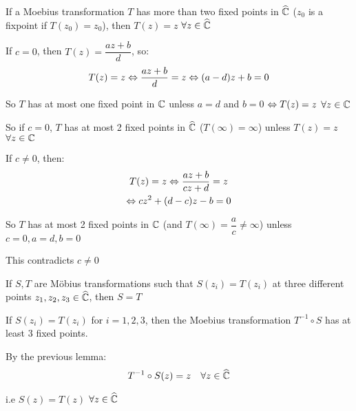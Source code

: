 \par\bigskip
\begin{lem}[]{}
  If a Moebius transformation $T$ has more than two fixed points in $\widehat{\mathbb{C}}$ ($z_0$ is a fixpoint if $T(z_0) = z_0$), then $T(z) = z$ $\forall z\in\widehat{\mathbb{C}}$
\end{lem}
\par\bigskip
\begin{prf}[]{}
  If $c=0$, then $T(z) = \dfrac{az+b}{d}$, so:
  \begin{equation*}
    \begin{gathered}
      T(z) = z\Leftrightarrow \dfrac{az+b}{d}=z\Leftrightarrow (a-d)z+b = 0
    \end{gathered}
  \end{equation*}\par
  \noindent So $T$ has at most one fixed point in $\mathbb{C}$ unless $a = d$ and $b=0$ $\Leftrightarrow T(z) = z$ $\forall z\in\mathbb{C}$
  \par\bigskip
  \noindent So if $c=0$, $T$ has at most 2 fixed points in $\widehat{\mathbb{C}}$ ($T(\infty) = \infty$) unless $T(z) = z$  $\forall z\in\mathbb{C}$
  \par\bigskip
  \noindent If $c\neq0$, then:
  \begin{equation*}
    \begin{gathered}
      T(z) = z \Leftrightarrow \dfrac{az+b}{cz+d} = z\\
      \Leftrightarrow cz^2+(d-c)z-b=0
    \end{gathered}
  \end{equation*}
  \par\bigskip
  \noindent So $T$ has at most 2 fixed points in $\mathbb{C}$ (and $T(\infty) = \dfrac{a}{c}\neq\infty$) unless $c=0,a=d,b=0$\par
  \noindent This contradicts $c\neq0$
\end{prf}
\par\bigskip
\begin{theo}[]{}
  If $S,T$ are Möbius transformations such that $S(z_i) = T(z_i)$ at three different points $z_1,z_2,z_3\in \widehat{\mathbb{C}}$, then $S = T$
\end{theo}
\par\bigskip
\begin{prf}[]{}
  If $S(z_i) = T(z_i)$ for $i=1,2,3$, then the Moebius transformation $T^{-1}\circ S$ has at least 3 fixed points.\par
  \noindent By the previous lemma:
  \begin{equation*}
    \begin{gathered}
      T^{-1}\circ S(z) = z\quad\forall z\in\widehat{\mathbb{C}}
    \end{gathered}
  \end{equation*}\par
  \noindent i.e $S(z) = T(z)$ $\forall z\in\widehat{\mathbb{C}}$
\end{prf}
